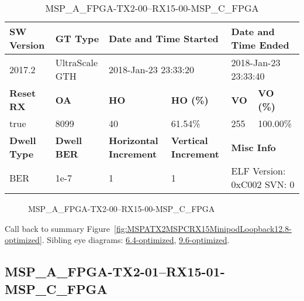 \begin{table}[h]
\centering
\caption{MSP\_A\_FPGA-TX2-00--RX15-00-MSP\_C\_FPGA}
\label{tab:MSPAFPGATX200RX1500MSPCFPGA12.8-optimized}
\begin{tabular}{@{}|l|l|l|l|l|l|@{}}
\toprule
\textbf{SW Version}                & \textbf{GT Type}   & \multicolumn{2}{l|}{\textbf{Date and Time Started}}            & \multicolumn{2}{l|}{\textbf{Date and Time Ended}}        \\ \midrule
2017.2                       & UltraScale GTH          & \multicolumn{2}{l|}{2018-Jan-23 23:33:20}                   & \multicolumn{2}{l|}{2018-Jan-23 23:33:40}               \\ \midrule
\textbf{Reset RX}                  & \textbf{OA} & \textbf{HO}   & \textbf{HO (\%)} & \textbf{VO} & \textbf{VO (\%)} \\ \midrule
true & 8099        & 40          & 61.54\%        & 255        & 100.00\%       \\ \midrule
\textbf{Dwell Type}                & \textbf{Dwell BER} & \textbf{Horizontal Increment} & \textbf{Vertical Increment}    & \multicolumn{2}{l|}{\textbf{Misc Info}}                  \\ \midrule
BER                            & 1e-7        & 1        & 1           & \multicolumn{2}{l|}{ELF Version: 0xC002 SVN: 0}                         \\ \bottomrule
\end{tabular}
\end{table}

\begin{figure}[h]
\caption{MSP\_A\_FPGA-TX2-00--RX15-00-MSP\_C\_FPGA} \label{fig:MSPAFPGATX200RX1500MSPCFPGA12.8-optimized}
\end{figure}

Call back to summary Figure~\ref{fig:MSPATX2MSPCRX15MinipodLoopback12.8-optimized}.
Sibling eye diagrams: \hyperref[sec:MSPAFPGATX200RX1500MSPCFPGA6.4-optimized]{6.4-optimized}, \hyperref[sec:MSPAFPGATX200RX1500MSPCFPGA9.6-optimized]{9.6-optimized}.

\clearpage
\newpage


\subsection{MSP\_A\_FPGA-TX2-01--RX15-01-MSP\_C\_FPGA}\label{sec:MSPAFPGATX201RX1501MSPCFPGA12.8-optimized}

